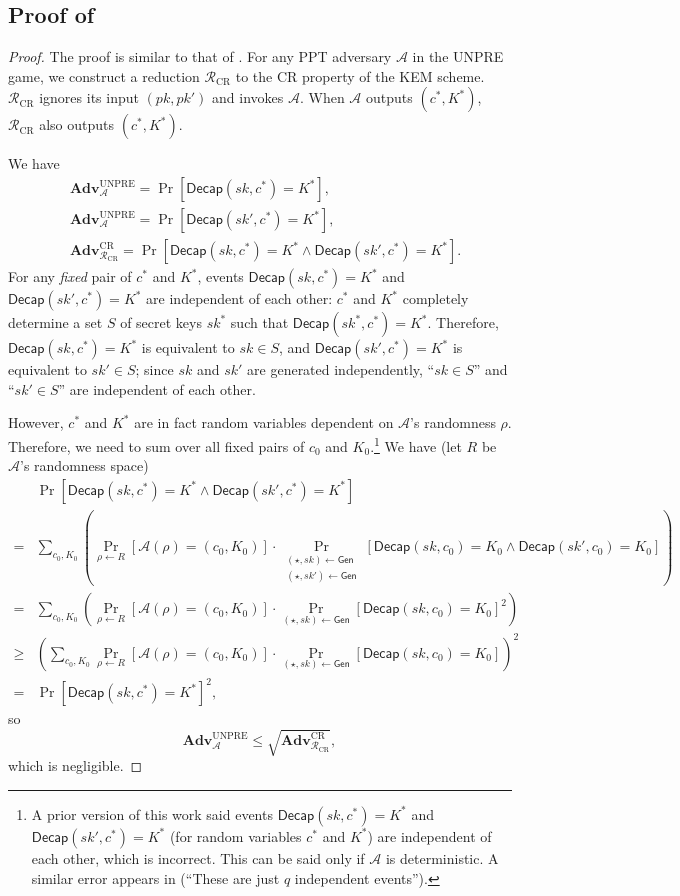\documentclass{article}
\theoremstyle{plain}
\theoremstyle{definition}
\theoremstyle{remark}
\newcommand{\adv}{\mathcal{A}}
\newcommand{\red}{\mathcal{R}}
\newcommand{\Adv}{\mathbf{Adv}}
\newcommand{\Gen}{\mathsf{Gen}}
\newcommand{\Decap}{\mathsf{Decap}}
\begin{document}
\subsection{Proof of }
\label{app:unpre}
\begin{proof}
The proof is similar to that of \cite[Theorem~2]{RSA:AMORS26}. For any PPT adversary $\adv$ in the UNPRE game, we construct a reduction $\red_\text{CR}$ to the CR property of the KEM scheme. $\red_\text{CR}$ ignores its input $(pk,pk')$ and invokes $\adv$. When $\adv$ outputs $(c^*,K^*)$, $\red_\text{CR}$ also outputs $(c^*,K^*)$.

We have
\begin{align*}
& \Adv_\adv^\text{UNPRE} = \Pr[\Decap(sk,c^*) = K^*], \\
& \Adv_\adv^\text{UNPRE} = \Pr[\Decap(sk',c^*) = K^*], \\
& \Adv_{\red_\text{CR}}^\text{CR} = \Pr[\Decap(sk,c^*) = K^* \land \Decap(sk',c^*) = K^*].
\end{align*}
For any \emph{fixed} pair of $c^*$ and $K^*$, events $\Decap(sk,c^*) = K^*$ and $\Decap(sk',c^*) = K^*$ are independent of each other: $c^*$ and $K^*$ completely determine a set $S$ of secret keys $sk^*$ such that $\Decap(sk^*,c^*) = K^*$. Therefore, $\Decap(sk,c^*) = K^*$ is equivalent to $sk \in S$, and $\Decap(sk',c^*) = K^*$ is equivalent to $sk' \in S$; since $sk$ and $sk'$ are generated independently, ``$sk \in S$'' and ``$sk' \in S$'' are independent of each other.

However, $c^*$ and $K^*$ are in fact random variables dependent on $\adv$'s randomness $\rho$. Therefore, we need to sum over all fixed pairs of $c_0$ and $K_0$.\footnote{\label{fn:error}A prior version of this work said events $\Decap(sk,c^*) = K^*$ and $\Decap(sk',c^*) = K^*$ (for random variables $c^*$ and $K^*$) are independent of each other, which is incorrect. This can be said only if $\adv$ is deterministic. A similar error appears in \cite[Section~5.3,~Hybrid~2]{EC:JanRoyXu25} (``These are just $q$ independent events'').} We have (let $R$ be $\adv$'s randomness space)
\begin{align*}
& \Pr[\Decap(sk,c^*) = K^* \land \Decap(sk',c^*) = K^*] \\
=& \sum_{c_0,K_0} \left(\Pr_{\rho \gets R}[\adv(\rho) = (c_0,K_0)] \cdot \Pr_{\substack{(\star,sk) \gets \Gen \\ (\star,sk') \gets \Gen}}[\Decap(sk,c_0) = K_0 \land \Decap(sk',c_0) = K_0]\right) \\
=& \sum_{c_0,K_0} \left(\Pr_{\rho \gets R}[\adv(\rho) = (c_0,K_0)] \cdot \Pr_{(\star,sk) \gets \Gen}[\Decap(sk,c_0) = K_0]^2\right) \\
\geq& \left(\sum_{c_0,K_0} \Pr_{\rho \gets R}[\adv(\rho) = (c_0,K_0)] \cdot \Pr_{(\star,sk) \gets \Gen}[\Decap(sk,c_0) = K_0]\right)^2 \\
=& \Pr[\Decap(sk,c^*) = K^*]^2,
\end{align*}
so
\[
\Adv_\adv^\text{UNPRE} \leq \sqrt{\Adv_{\red_\text{CR}}^\text{CR}},
\]
which is negligible.
\end{proof}
\end{document}
